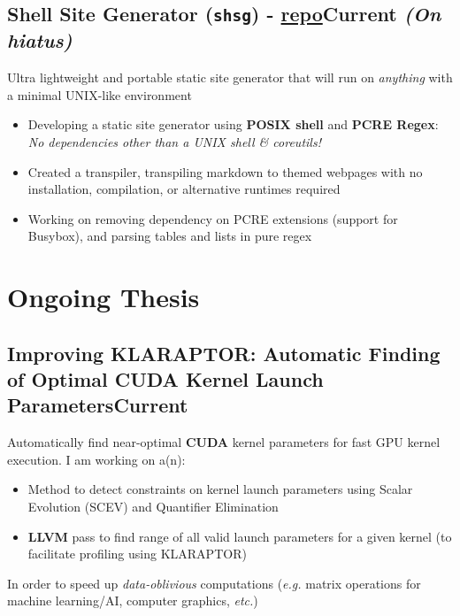 \documentclass[9pt]{article}
\begin{document}
\subsection{Shell Site Generator (\texttt{shsg}) \normalsize\textnormal{- \href{https://github.com/ianayl/shsg}{repo}}\hfill \normalsize\textnormal{Current \textit{(On hiatus)}}}
  Ultra lightweight and portable static site generator that will run on \textit{anything} with a minimal UNIX-like environment
\vspace{-0.5em}
\begin{itemize}
  \item Developing a static site generator using \textbf{POSIX shell} and \textbf{PCRE Regex}: \textit{No dependencies other than a UNIX shell \& coreutils!}
  \item Created a transpiler, transpiling markdown to themed webpages with no installation, compilation, or alternative runtimes required
    \item Working on removing dependency on PCRE extensions (support for Busybox), and parsing tables and lists in pure regex
\end{itemize}

\section*{Ongoing Thesis}

\subsection{Improving KLARAPTOR: Automatic Finding of Optimal CUDA Kernel Launch Parameters\hfill \normalsize\textnormal{Current}}
Automatically find near-optimal \textbf{CUDA} kernel parameters for fast GPU kernel execution. I am working on a(n):
\vspace{-0.5em}
\begin{itemize}
  \item Method to detect constraints on kernel launch parameters using Scalar Evolution (SCEV) and Quantifier Elimination

  \item \textbf{LLVM} pass to find range of all valid launch parameters for a given kernel (to facilitate profiling using KLARAPTOR)
\end{itemize}
\vspace{-0.5em}
In order to speed up \textit{data-oblivious} computations (\textit{e.g.} matrix operations for machine learning/AI, computer graphics, \textit{etc.})
\end{document}
